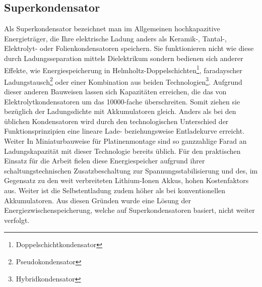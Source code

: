 \documentclass[12pt]{scrreprt} %
\begin{document}
\subsection{Superkondensator}
Als Superkondensator bezeichnet man im Allgemeinen hochkapazitive Energieträger, die Ihre elektrische Ladung anders als Keramik-, Tantal-, Elektrolyt- oder Folienkondensatoren speichern. Sie funktionieren nicht wie diese durch Ladungsseparation mittels Dielektrikum sondern bedienen sich anderer Effekte, wie Energiespeicherung in Helmholtz-Doppelschichten\footnote{Doppelschichtkondensator}, faradayscher Ladungstausch\footnote{Pseudokondensator} oder einer Kombination aus beiden Technologien\footnote{Hybridkondensator}. Aufgrund dieser anderen Bauweisen lassen sich Kapazitäten erreichen, die das von Elektrolytkondensatoren um das 10000-fache überschreiten. Somit ziehen sie bezüglich der Ladungsdichte mit Akkumulatoren gleich. Anders als bei den üblichen Kondensatoren wird durch den technologischen Unterschied der Funktionsprinzipien eine lineare Lade- beziehungsweise Entladekurve erreicht. Weiter In Miniaturbauweise für Platinenmontage sind so ganzzahlige Farad an Ladungskapazität mit dieser Technologie bereits üblich. Für den praktischen Einsatz für die Arbeit fielen diese Energiespeicher aufgrund ihrer schaltungstechnischen Zusatzbeschaltung zur Spannungsstabilisierung und des, im Gegensatz zu den weit verbreiteten Lithium-Ionen Akkus, hohen Kostenfaktors aus. Weiter ist die Selbstentladung zudem höher als bei konventionellen Akkumulatoren. Aus diesen Gründen wurde eine Lösung der Energiezwischenspeicherung, welche auf Superkondensatoren basiert, nicht weiter verfolgt.
\end{document}
